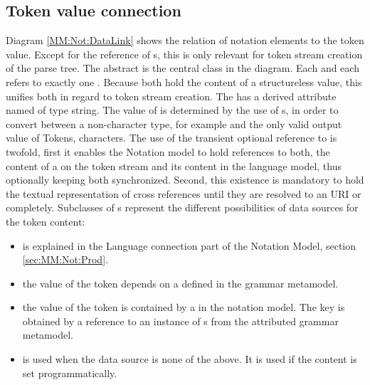 \subsection{Token value connection} \label{ss:tokenValCon}
Diagram \ref{MM:Not:DataLink} shows the relation of notation elements to the token value. Except for the  reference of s, this is only relevant for token stream creation of the parse tree. The abstract  is the central class in the diagram. Each  and each  refers to exactly one . Because both hold the content of a structureless value, this unifies both in regard to token stream creation. The  has a derived attribute named  of type string. The value of  is determined by the use of s, in order to convert between a non-character type, for example  and the only valid output value of Tokens, characters. The use of the transient optional reference to  is twofold, first it enables the Notation model to hold references to both, the content of a  on the token stream and its content in the language model, thus optionally keeping both synchronized. Second, this existence is mandatory to hold the textual representation of cross references until they are resolved to an URI or completely. Subclasses of s represent the different possibilities of data sources for the token content:
\begin{itemize}
	\item {} is explained in the Language connection part of the Notation Model, section \ref{sec:MM:Not:Prod}.
	\item {} the value of the token depends on a   defined in the grammar metamodel.
	\item {} the value of the token is contained by a  in the notation model. The key is obtained by a reference to an instance of s from the attributed grammar metamodel.
	\item {} is used when the data source is none of the above. It is used if the content is set programmatically.
\end{itemize}


